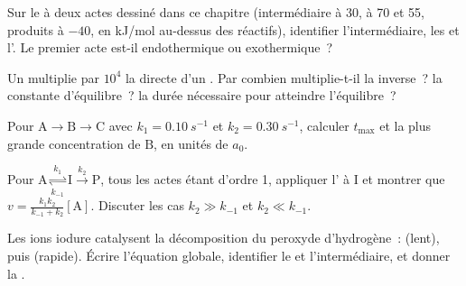 \begin{exercise}[$\star$]\label{exo:b1:elementary-steps:3}
Sur le  à deux actes dessiné dans ce chapitre
(intermédiaire à 30,  à 70 et 55, produits à $-40$,
en \unit{kJ/mol} au-dessus des réactifs), identifier l'intermédiaire,
les  et l'. Le
premier acte est-il endothermique ou exothermique~?
\end{exercise}

\begin{exercise}[$\star$]\label{exo:b1:elementary-steps:4}
Un  multiplie par $10^4$ la  directe d'un
. Par combien multiplie-t-il la 
inverse~? la constante d'équilibre~? la durée nécessaire pour atteindre
l'équilibre~?
\end{exercise}

\begin{exercise}[$\star\star$]\label{exo:b1:elementary-steps:5}
Pour $\mathrm{A} \to \mathrm{B} \to \mathrm{C}$ avec $k_1 =
\qty{0.10}{s^{-1}}$ et $k_2 = \qty{0.30}{s^{-1}}$, calculer $t_{\max}$
et la plus grande concentration de $\mathrm{B}$, en unités de $a_0$.
\end{exercise}

\begin{exercise}[$\star\star$]\label{exo:b1:elementary-steps:6}
Pour $\mathrm{A} \underset{k_{-1}}{\overset{k_1}{\rightleftharpoons}}
\mathrm{I} \xrightarrow{k_2} \mathrm{P}$, tous les actes étant d'ordre 1,
appliquer l' à $\mathrm{I}$
et montrer que $v =
\frac{k_1k_2}{k_{-1} + k_2}[\mathrm{A}]$. Discuter les cas $k_2 \gg
k_{-1}$ et $k_2 \ll k_{-1}$.
\end{exercise}

\begin{exercise}[$\star\star$]\label{exo:b1:elementary-steps:7}
Les ions iodure catalysent la décomposition du peroxyde d'hydrogène~:
 (lent), puis 
(rapide). Écrire l'équation globale, identifier le  et
l'intermédiaire, et donner la .
\end{exercise}

